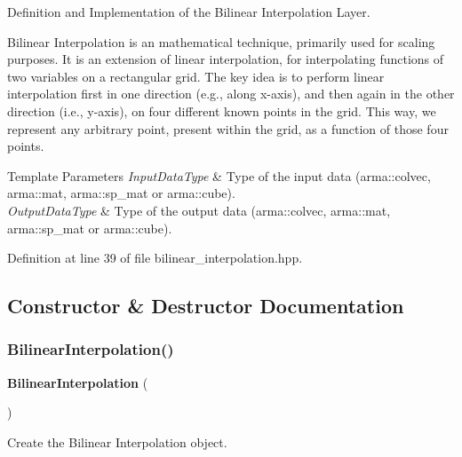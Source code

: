 Definition and Implementation of the Bilinear Interpolation Layer. 

Bilinear Interpolation is an mathematical technique, primarily used for scaling purposes. It is an extension of linear interpolation, for interpolating functions of two variables on a rectangular grid. The key idea is to perform linear interpolation first in one direction (e.\+g., along x-\/axis), and then again in the other direction (i.\+e., y-\/axis), on four different known points in the grid. This way, we represent any arbitrary point, present within the grid, as a function of those four points.


\begin{DoxyTemplParams}{Template Parameters}
{\em Input\+Data\+Type} & Type of the input data (arma\+::colvec, arma\+::mat, arma\+::sp\+\_\+mat or arma\+::cube). \\
\hline
{\em Output\+Data\+Type} & Type of the output data (arma\+::colvec, arma\+::mat, arma\+::sp\+\_\+mat or arma\+::cube). \\
\hline
\end{DoxyTemplParams}


Definition at line 39 of file bilinear\+\_\+interpolation.\+hpp.



\subsection{Constructor \& Destructor Documentation}
\mbox{\label{classmlpack_1_1ann_1_1BilinearInterpolation_a8373b0b3b099c636a8e438baadfa3baf}} 
\subsubsection{Bilinear\+Interpolation()\hspace{0.1cm}{\footnotesize\ttfamily [1/2]}}
{\footnotesize\ttfamily \textbf{ Bilinear\+Interpolation} (\begin{DoxyParamCaption}{ }\end{DoxyParamCaption})}



Create the Bilinear Interpolation object. 

\mbox{\label{classmlpack_1_1ann_1_1BilinearInterpolation_ad384fa6deb9134484dea8961a70df35f}} 
